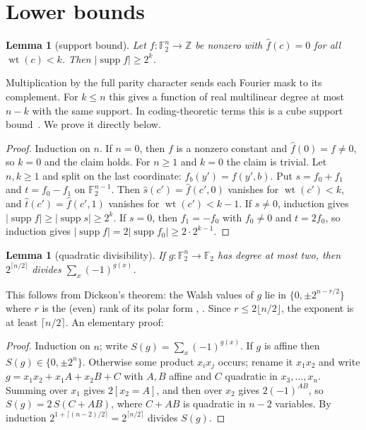 \documentclass[11pt]{article}
\newtheorem{lemma}[theorem]{Lemma}
\theoremstyle{definition}
\theoremstyle{remark}
\newcommand{\F}{\mathbb{F}_2}
\newcommand{\wt}{\operatorname{wt}}
\begin{document}
\section{Lower bounds}

\begin{lemma}[support bound]\label{lem:support}
Let $f\colon\F^n\to\mathbb{Z}$ be nonzero with $\hat f(c)=0$ for all
$\wt(c)<k$. Then $|\operatorname{supp} f|\ge 2^k$.
\end{lemma}

Multiplication by the full parity character sends each Fourier mask to its
complement. For $k\le n$ this gives a function of real multilinear degree at
most $n-k$ with the same support. In coding-theoretic terms this is a cube
support bound~\cite{Delsarte73,MacWilliamsSloane,ODonnell}. We prove it
directly below.

\begin{proof}
Induction on $n$. If $n=0$, then $f$ is a nonzero constant and $\hat f(0)=f\ne0$,
so $k=0$ and the claim holds. For $n\ge1$ and $k=0$ the claim is trivial. Let
$n,k\ge1$ and split on the last coordinate: $f_b(y')=f(y',b)$. Put
$s=f_0+f_1$ and $t=f_0-f_1$ on $\F^{n-1}$. Then
$\hat s(c')=\hat f(c',0)$ vanishes for $\wt(c')<k$, and
$\hat t(c')=\hat f(c',1)$ vanishes for $\wt(c')<k-1$.
If $s\neq0$, induction gives
$|\operatorname{supp} f|\ge|\operatorname{supp} s|\ge 2^k$.
If $s=0$, then $f_1=-f_0$ with $f_0\ne0$ and $t=2f_0$, so induction gives
$|\operatorname{supp} f|=2|\operatorname{supp} f_0|\ge 2\cdot2^{k-1}$.
\end{proof}

\begin{lemma}[quadratic divisibility]\label{lem:divisibility}
If $g\colon\F^n\to\F$ has degree at most two, then
$2^{\lceil n/2\rceil}$ divides $\sum_x(-1)^{g(x)}$.
\end{lemma}

This follows from Dickson's theorem: the Walsh values of $g$ lie in
$\{0,\pm2^{n-r/2}\}$ where $r$ is the (even) rank of its polar form
\cite[Ch.~15]{MacWilliamsSloane}, \cite{Carlet21}. Since $r\le 2\lfloor
n/2\rfloor$, the exponent is at least $\lceil n/2\rceil$. An elementary proof:

\begin{proof}
Induction on $n$; write $S(g)=\sum_x(-1)^{g(x)}$. If $g$ is affine then
$S(g)\in\{0,\pm2^n\}$. Otherwise some product $x_ix_j$ occurs; rename it $x_1x_2$
and write $g=x_1x_2+x_1A+x_2B+C$ with $A,B$ affine and $C$ quadratic in
$x_3,\dots,x_n$. Summing over $x_1$ gives $2[x_2=A]$, and then over $x_2$ gives
$2(-1)^{AB}$, so $S(g)=2\,S(C+AB)$, where $C+AB$ is quadratic in $n-2$ variables.
By induction $2^{1+\lceil (n-2)/2\rceil}=2^{\lceil n/2\rceil}$ divides $S(g)$.
\end{proof}
\end{document}

